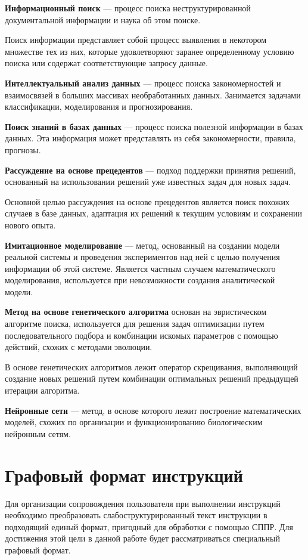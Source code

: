 \textbf{Информационный поиск} --- процесс поиска неструктурированной документальной информации и наука об этом поиске.

Поиск информации представляет собой процесс выявления в некотором множестве тех из них, которые удовлетворяют заранее определенному условию поиска или содержат соответствующие запросу данные.

\textbf{Интеллектуальный анализ данных} --- процесс поиска закономерностей и взаимосвязей в больших массивах необработанных данных.
Занимается задачами классификации, моделирования и прогнозирования.

\textbf{Поиск знаний в базах данных} --- процесс поиска полезной информации в базах данных.
Эта информация может представлять из себя закономерности, правила, прогнозы.

\textbf{Рассуждение на основе прецедентов} --- подход поддержки принятия решений, основанный на использовании решений уже известных задач для новых задач. 

Основной целью рассуждения на основе прецедентов является поиск похожих случаев в базе данных, адаптация их решений к текущим условиям и сохранении нового опыта.

\textbf{Имитационное моделирование} --- метод, основанный на создании модели реальной системы и проведения экспериментов над ней с целью получения информации об этой системе.
Является частным случаем математического моделирования, используется при невозможности создания аналитической модели.

\textbf{Метод на основе генетического алгоритма} основан на эвристическом алгоритме поиска, используется для решения задач оптимизации путем последовательного подбора и комбинации искомых параметров с помощью действий, схожих с методами эволюции.

В основе генетических алгоритмов лежит оператор скрещивания, выполняющий создание новых решений путем комбинации оптимальных решений предыдущей итерации алгоритма.

\textbf{Нейронные сети} --- метод, в основе которого лежит построение математических моделей, схожих по организации и функционированию биологическим нейронным сетям.

\section{Графовый формат инструкций}
\label{graph_format}
Для организации сопровождения пользователя при выполнении инструкций необходимо преобразовать слабоструктурированный текст инструкции в подходящий единый формат, пригодный для обработки с помощью СППР.
Для достижения этой цели в данной работе будет рассматриваться специальный графовый формат.


